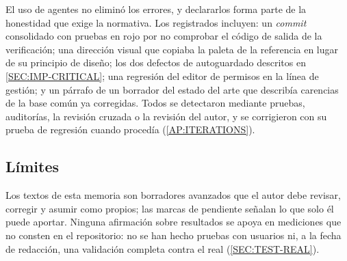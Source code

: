 El uso de agentes no eliminó los errores, y declararlos forma parte de la honestidad que
exige la normativa. Los registrados incluyen: un \textit{commit} consolidado con pruebas en
rojo por no comprobar el código de salida de la verificación; una dirección visual que
copiaba la paleta de la referencia en lugar de su principio de diseño; los dos defectos de
autoguardado descritos en \cref{SEC:IMP-CRITICAL}; una regresión del editor de permisos en la
línea de gestión; y un párrafo de un borrador del estado del arte que describía carencias de
la base común ya corregidas. Todos se detectaron mediante pruebas, auditorías, la revisión
cruzada o la revisión del autor, y se corrigieron con su prueba de regresión cuando
procedía (\cref{AP:ITERATIONS}).

\subsection{Límites}

Los textos de esta memoria son borradores avanzados que el autor debe revisar, corregir y
asumir como propios; las marcas de pendiente señalan lo que solo él puede aportar. Ninguna
afirmación sobre resultados se apoya en mediciones que no consten en el repositorio: no se
han hecho pruebas con usuarios ni, a la fecha de redacción, una validación completa contra el
 real (\cref{SEC:TEST-REAL}).


